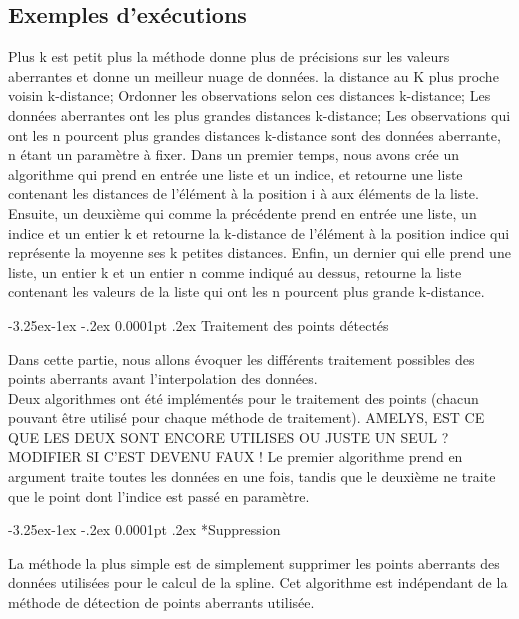 \documentclass[a4paper,12pt]{article} %
\makeatletter
\renewcommand\paragraph{\@startsection{paragraph}{4}{\z@}%
                                      {-3.25ex\@plus -1ex \@minus -.2ex}%
                                      {0.0001pt \@plus .2ex}%
                                      {\normalfont\normalsize\bfseries}}
\renewcommand\subparagraph{\@startsection{subparagraph}{5}{\z@}%
                                      {-3.25ex\@plus -1ex \@minus -.2ex}%
                                      {0.0001pt \@plus .2ex}%
                                      {\normalfont\normalsize\bfseries}}
\makeatother
\begin{document}
                        \subsection{Exemples d’exécutions}
                        Plus k est petit plus la méthode donne plus de précisions sur les valeurs aberrantes et donne un meilleur nuage de données.    					
    					la distance au K plus proche voisin k-distance; Ordonner les observations selon ces distances k-distance; Les données aberrantes ont les plus grandes distances k-distance; Les observations qui ont les n pourcent plus grandes distances k-distance sont des données aberrante, n étant un paramètre à ﬁxer. Dans un premier temps, nous avons crée un algorithme qui prend en entrée une liste et un indice, et retourne une liste contenant les distances de l’élément à la position i à aux éléments de la liste. Ensuite, un deuxième qui comme la précédente prend en entrée une liste, un indice et un entier k et retourne la k-distance de l’élément à la position indice qui représente la moyenne ses k petites distances. Enﬁn, un dernier qui elle prend une liste, un entier k et un entier n comme indiqué au dessus, retourne la liste contenant les valeurs de la liste qui ont les n pourcent plus grande k-distance.
    					

				\paragraph{Traitement des points détectés}
				
    				Dans cette partie, nous allons évoquer les différents traitement possibles des points aberrants avant l'interpolation des données.\\
                        
                    Deux algorithmes ont été implémentés pour le traitement des points (chacun pouvant être utilisé pour chaque méthode de traitement). AMELYS, EST CE QUE LES DEUX SONT ENCORE UTILISES OU JUSTE UN SEUL ? MODIFIER SI C'EST DEVENU FAUX !
                    Le premier algorithme prend en argument traite toutes les données en une fois, tandis que le deuxième ne traite que le point dont l'indice est passé en paramètre. 
                    
					\subparagraph*{Suppression}
                    					
                        La méthode la plus simple est de simplement supprimer les points aberrants des données utilisées pour le calcul de la spline. Cet algorithme est indépendant de la méthode de détection de points aberrants utilisée.
                        
\end{document}
